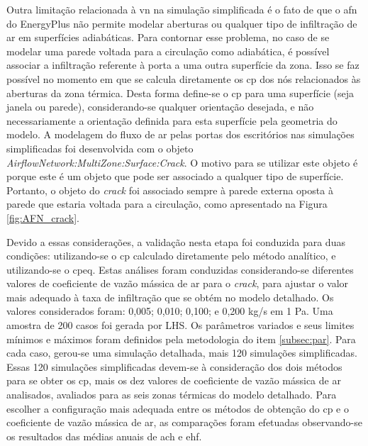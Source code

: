 \documentclass[brazil,hardcopy,openany]{ufscthesis} %
\begin{document}
Outra limitação relacionada à \acrshort{vn} na simulação simplificada é o fato de que o \acrshort{afn} do EnergyPlus não permite modelar aberturas ou qualquer tipo de infiltração de ar em superfícies adiabáticas. Para contornar esse problema, no caso de se modelar uma parede voltada para a circulação como adiabática, é possível associar a infiltração referente à porta a uma outra superfície da zona.  %
Isso se faz possível no momento em que se calcula diretamente os \acrfull{cp} dos nós relacionados às aberturas da zona térmica.
Desta forma define-se o \acrshort{cp} para uma superfície (seja janela ou parede), considerando-se qualquer orientação desejada, e não necessariamente a orientação definida para esta superfície pela geometria do modelo.		
A modelagem do fluxo de ar pelas portas dos escritórios nas simulações simplificadas foi desenvolvida com o objeto \textit{AirflowNetwork:MultiZone:Surface:Crack}. O motivo para se utilizar este objeto é porque este é um objeto que pode ser associado a qualquer tipo de superfície. Portanto, o objeto do \textit{crack} foi associado sempre à parede externa oposta à parede que estaria voltada para a circulação, como apresentado na Figura \ref{fig:AFN_crack}.

Devido a essas considerações, a validação nesta etapa foi conduzida para duas condições: utilizando-se o \acrshort{cp} calculado diretamente pelo método analítico, e utilizando-se o \acrfull{cpeq}.		
Estas análises foram conduzidas considerando-se diferentes valores de coeficiente de vazão mássica de ar para o \textit{crack}, para ajustar o valor mais adequado à taxa de infiltração que se obtém no modelo detalhado. Os valores considerados foram: 0,005; 0,010; 0,100; e 0,200 kg/s em 1 Pa.
Uma amostra de 200 casos foi gerada por LHS.
Os parâmetros variados e seus limites mínimos e máximos foram definidos pela metodologia do item \ref{subsec:par}.
Para cada caso, gerou-se uma simulação detalhada, mais 120 simulações simplificadas. Essas 120 simulações simplificadas devem-se à consideração dos dois métodos para se obter os \acrshort{cp}, mais os dez valores de coeficiente de vazão mássica de ar analisados, avaliados para as seis zonas térmicas do modelo detalhado. 
Para escolher a configuração mais adequada entre os métodos de obtenção do \acrshort{cp} e o coeficiente de vazão mássica de ar, as comparações foram efetuadas observando-se os resultados das médias anuais de \acrshort{ach} e \acrshort{ehf}.
\end{document}
